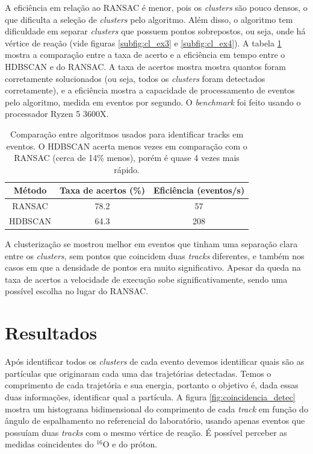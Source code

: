 \documentclass[a4paper,12pt,oneside]{book}
\begin{document}
\par A eficiência em relação ao RANSAC é menor, pois os \textit{clusters} são pouco densos, o que dificulta a seleção de \textit{clusters} pelo algoritmo. Além disso, o algoritmo tem dificuldade em separar \textit{clusters} que possuem pontos sobrepostos, ou seja, onde há vértice de reação (vide figuras \ref{subfig:cl_ex3} e \ref{subfig:cl_ex4}). A tabela \ref{tabela:ransacvshdbscan} mostra a comparação entre a taxa de acerto e a eficiência em tempo entre o HDBSCAN e do RANSAC. A taxa de acertos mostra mostra quantos foram corretamente solucionados (ou seja, todos os \textit{clusters} foram detectados corretamente), e a eficiência mostra a capacidade de processamento de eventos pelo algoritmo, medida em eventos por segundo. O \textit{benchmark} foi feito usando o processador Ryzen 5 3600X.

\begin{table}[H]
\centering
\caption{Comparação entre algoritmos usados para identificar tracks em eventos. O HDBSCAN acerta menos vezes em comparação com o RANSAC (cerca de 14\% menos), porém é quase 4 vezes mais rápido. }
\label{tabela:ransacvshdbscan}
\begin{tabular}{|c|c|c|}
\hline
Método  & Taxa de acertos (\%) & Eficiência (eventos/s) \\ \hline
RANSAC  & 78.2                 & 57                     \\ \hline
HDBSCAN & 64.3                 & 208                    \\ \hline
\end{tabular}
\end{table}

\par A clusterização se mostrou melhor em eventos que tinham uma separação clara entre os \textit{clusters}, sem pontos que coincidem duas \textit{tracks} diferentes\cite{TriplClust}, e também nos casos em que a densidade de pontos era muito significativo. Apesar da queda na taxa de acertos a velocidade de execução sobe significativamente, sendo uma possível escolha no lugar do RANSAC.

\chapter{Resultados}

\par Após identificar todos os \textit{clusters} de cada evento devemos identificar quais são as partículas que originaram cada uma das trajetórias detectadas. Temos o comprimento de cada trajetória e sua energia, portanto o objetivo é, dada essas duas informações, identificar qual a partícula. A figura \ref{fig:coincidencia_detec} mostra um histograma bidimensional do comprimento de cada \textit{track} em função do ângulo de espalhamento no referencial do laboratório, usando apenas eventos que possuíam duas \textit{tracks} com o mesmo vértice de reação. É possível perceber as medidas coincidentes do $^{16}$O e do próton.
\end{document}
